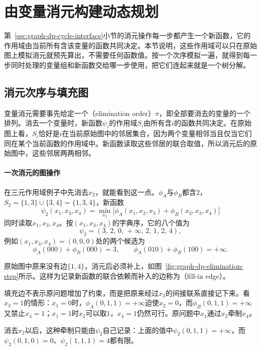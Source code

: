 
\section{由变量消元构建动态规划}
\label{sec:graph-variable-elimination}

第~\ref{sec:graph-dp-cycle-interface}小节的消元操作每一步都产生一个新函数，它的作用域由当前所有含该变量的函数共同决定。本节说明，这些作用域可以只在原始图上模拟消元就预先算出，不需要任何函数值。按一个次序模拟一遍，就得到每一步同时处理的变量组和新函数交给哪一步使用，把它们连起来就是一个树分解。

\subsection{消元次序与填充图}
\label{sec:graph-dp-fill-in}

变量消元需要事先给定一个（elimination order）$\pi$，即全部要消去的变量的一个排列。消去一个变量时，新函数$\psi_i$的作用域$S_i$由所有含$i$的函数共同决定。在原始图上看，$S_i$恰好是$i$在当前原始图中的邻居集合，因为两个变量相邻当且仅当它们同在某个当前函数的作用域中。新函数读取这些邻居的联合取值，所以消元后的原始图中，这些邻居两两相邻。

\paragraph{一次消元的图操作}
在三元作用域例子中先消去$x_2$，就能看到这一点。$\phi_A$与$\phi_B$都含$2$，$S_2=\{1,3\}\cup\{3,4\}=\{1,3,4\}$，新函数
\[
\psi_2(x_1,x_3,x_4)=\min_{x_2}\bigl[\phi_A(x_1,x_2,x_3)+\phi_B(x_2,x_3,x_4)\bigr]
\]
同时读取$x_1,x_3,x_4$。按$(x_1,x_3,x_4)$的字典序，它的八个值为
\[
\psi_2=(3,\,2,\,0,\,+\infty,\,2,\,1,\,2,\,4),
\]
例如$(x_1,x_3,x_4)=(0,0,0)$处的两个候选为
\[
\phi_A(000)+\phi_B(000)=3,\qquad \phi_A(010)+\phi_B(100)=+\infty.
\]

原始图中原来没有边$\{1,4\}$，消元后必须补上，如图~\ref{fig:graph-dp-elimination-step}所示。这样为记录新函数的联合依赖而补入的边称为（fill-in edge）。

填充边不表示原问题增加了约束，而是把原来经过$x_2$的间接联系直接记下来。看$x_3=1$的情形：$x_1=0$时，$\phi_A(0,1,1)=+\infty$迫使$x_2=0$，而$\phi_B(0,1,1)=+\infty$又禁止$x_4=1$；$x_1=1$时$x_2$可以取$1$，$x_4=1$仍然可行。原问题中$x_1$通过$x_2$牵制$x_4$。

消去$x_2$以后，这种牵制只能由$\psi_2$自己记录：上面的值中$\psi_2(0,1,1)=+\infty$，而$\psi_2(0,1,0)=0$、$\psi_2(1,1,1)=4$都有限。

